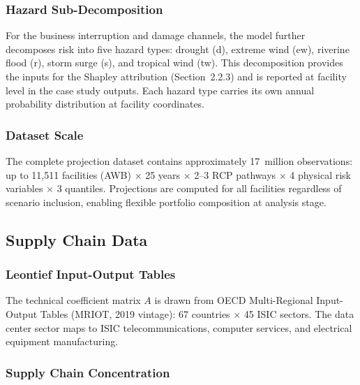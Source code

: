 \subsubsection{Hazard Sub-Decomposition}

For the business interruption and damage channels, the model further decomposes risk into
five hazard types: drought (d), extreme wind (ew), riverine flood (r), storm surge (s),
and tropical wind (tw). This decomposition provides the inputs for the Shapley attribution
(Section~2.2.3) and is reported at facility level in the case study outputs. Each hazard
type carries its own annual probability distribution at facility coordinates.

\subsubsection{Dataset Scale}

The complete projection dataset contains approximately 17~million observations:
up to 11{,}511 facilities (AWB) $\times$ 25 years $\times$ 2--3 RCP pathways $\times$
4 physical risk variables $\times$ 3 quantiles. Projections are computed for all facilities
regardless of scenario inclusion, enabling flexible portfolio composition at analysis stage.



\subsection{Supply Chain Data}
\label{app:supply_chain}

\subsubsection{Leontief Input-Output Tables}

The technical coefficient matrix $A$ is drawn from OECD Multi-Regional Input-Output Tables
(MRIOT, 2019 vintage): 67 countries $\times$ 45 ISIC sectors. The data center sector maps
to ISIC telecommunications, computer services, and electrical equipment manufacturing.

\subsubsection{Supply Chain Concentration}

